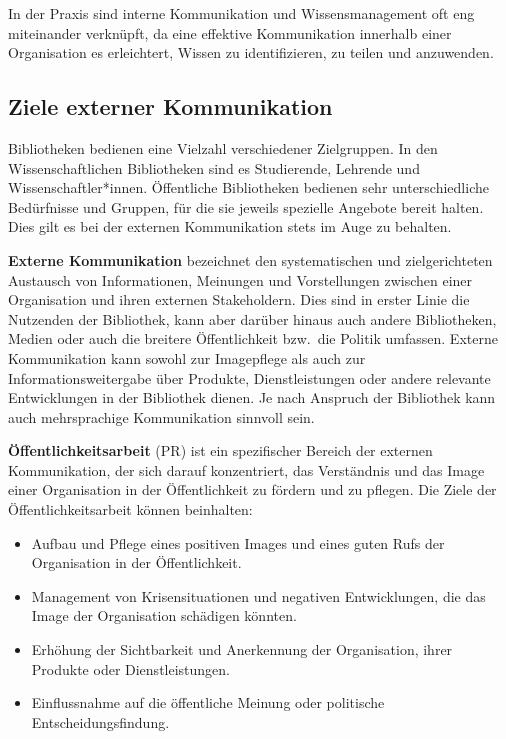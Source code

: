 \documentclass[
  11pt,
  letterpaper,
  DIV=11,
  twoside]{scrreprt}
\begin{document}
In der Praxis sind interne Kommunikation und Wissensmanagement oft eng
miteinander verknüpft, da eine effektive Kommunikation innerhalb einer
Organisation es erleichtert, Wissen zu identifizieren, zu teilen und
anzuwenden.

\subsection{Ziele externer
Kommunikation}\label{ziele-externer-kommunikation}

Bibliotheken bedienen eine Vielzahl verschiedener Zielgruppen. In den
Wissenschaftlichen Bibliotheken sind es Studierende, Lehrende und
Wissenschaftler*innen. Öffentliche Bibliotheken bedienen sehr
unterschiedliche Bedürfnisse und Gruppen, für die sie jeweils spezielle
Angebote bereit halten. Dies gilt es bei der externen Kommunikation
stets im Auge zu behalten.

\textbf{Externe Kommunikation} bezeichnet den systematischen und
zielgerichteten Austausch von Informationen, Meinungen und Vorstellungen
zwischen einer Organisation und ihren externen Stakeholdern. Dies sind
in erster Linie die Nutzenden der Bibliothek, kann aber darüber hinaus
auch andere Bibliotheken, Medien oder auch die breitere Öffentlichkeit
bzw.~die Politik umfassen. Externe Kommunikation kann sowohl zur
Imagepflege als auch zur Informationsweitergabe über Produkte,
Dienstleistungen oder andere relevante Entwicklungen in der Bibliothek
dienen. Je nach Anspruch der Bibliothek kann auch mehrsprachige
Kommunikation sinnvoll sein.

\textbf{Öffentlichkeitsarbeit} (PR) ist ein spezifischer Bereich der
externen Kommunikation, der sich darauf konzentriert, das Verständnis
und das Image einer Organisation in der Öffentlichkeit zu fördern und zu
pflegen. Die Ziele der Öffentlichkeitsarbeit können beinhalten:

\begin{itemize}
\item
  Aufbau und Pflege eines positiven Images und eines guten Rufs der
  Organisation in der Öffentlichkeit.
\item
  Management von Krisensituationen und negativen Entwicklungen, die das
  Image der Organisation schädigen könnten.
\item
  Erhöhung der Sichtbarkeit und Anerkennung der Organisation, ihrer
  Produkte oder Dienstleistungen.
\item
  Einflussnahme auf die öffentliche Meinung oder politische
  Entscheidungsfindung.
\end{itemize}
\end{document}
